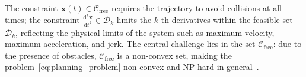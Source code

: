 
The constraint $\mathbf{x}(t) \in \mathcal{C}_{\mathrm{free}}$ requires the trajectory to avoid collisions at all times; the constraint $\frac{\mathrm{d}^k \mathbf{x}}{\mathrm{d}t^k} \in \mathcal{D}_k$ limits the $k$-th derivatives within the feasible set $\mathcal{D}_k$, reflecting the physical limits of the system such as maximum velocity, maximum acceleration, and jerk. The central challenge lies in the set $\mathcal{C}_{\mathrm{free}}$: due to the presence of obstacles, $\mathcal{C}_{\mathrm{free}}$ is a non-convex set, making the problem~\eqref{eq:planning_problem} non-convex and NP-hard in general~\cite{LaValle2006}.





